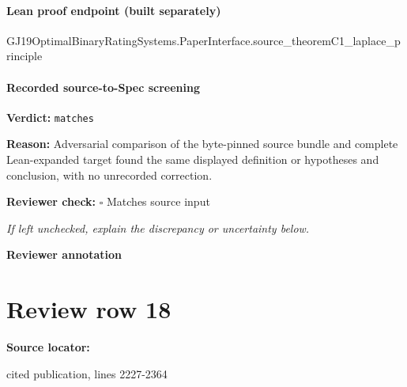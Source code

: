 \documentclass[10pt]{article}
\newcommand{\reviewerbox}{%
  \par\noindent\fbox{\parbox{0.96\linewidth}{\rule{0pt}{0.38in}}}\par
}
\newcommand{\reviewmatch}[1]{%
  \par\noindent\textbf{Reviewer check:} $\square$\; #1\par
  \noindent\emph{If left unchecked, explain the discrepancy or uncertainty below.}\par
}
\begin{document}
\paragraph{Lean proof endpoint (built separately)}\begin{ReviewVerbatim}
GJ19OptimalBinaryRatingSystems.PaperInterface.source_theoremC1_laplace_principle
\end{ReviewVerbatim}

\paragraph{Recorded source-to-Spec screening}
\textbf{Verdict:} \texttt{matches}
\\
{\raggedright
\textbf{Reason:} Adversarial comparison of the byte-\allowbreak{}pinned source bundle and complete Lean-\allowbreak{}expanded target found the same displayed definition or hypotheses and conclusion, with no unrecorded correction.\allowbreak{}
\par}
\reviewmatch{Matches source input}
\noindent\textbf{Reviewer annotation}\par
\reviewerbox
\clearpage
\hypertarget{source-claim-7529d1dedcffdbe3}{}
\section*{Review row 18}
\textbf{Source locator:} {\footnotesize\raggedright cited publication, lines 2227-\allowbreak{}2364\par}
\end{document}
